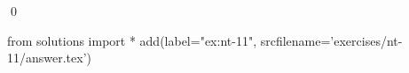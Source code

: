 
\begin{ex} 
  \label{ex:nt-11}
  
  \qed
\end{ex} 
\begin{python0}
from solutions import *
add(label="ex:nt-11",
    srcfilename='exercises/nt-11/answer.tex') 
\end{python0}
